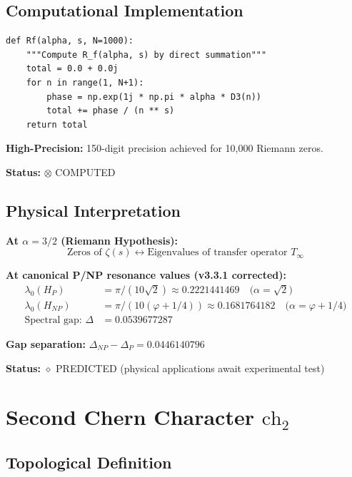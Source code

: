 \subsection{Computational Implementation}

\begin{verbatim}
def Rf(alpha, s, N=1000):
    """Compute R_f(alpha, s) by direct summation"""
    total = 0.0 + 0.0j
    for n in range(1, N+1):
        phase = np.exp(1j * np.pi * alpha * D3(n))
        total += phase / (n ** s)
    return total
\end{verbatim}

\textbf{High-Precision:} 150-digit precision achieved for 10,000 Riemann zeros.

\textbf{Status:} $\otimes$ COMPUTED

\subsection{Physical Interpretation}

\textbf{At $\alpha = 3/2$ (Riemann Hypothesis):}
\begin{equation}
\text{Zeros of } \zeta(s) \leftrightarrow \text{Eigenvalues of transfer operator } T_\infty
\end{equation}

\textbf{At canonical P/NP resonance values (v3.3.1 corrected):}
\begin{align}
\lambda_0(H_P) &= \pi/(10\sqrt{2}) \approx 0.2221441469 \quad \text{($\alpha = \sqrt{2}$)} \\
\lambda_0(H_{NP}) &= \pi/(10(\varphi+1/4)) \approx 0.1681764182 \quad \text{($\alpha = \varphi + 1/4$)} \\
\text{Spectral gap: } \Delta &= 0.0539677287
\end{align}

\textbf{Gap separation:} $\Delta_{NP} - \Delta_P = 0.0446140796$

\textbf{Status:} $\diamond$ PREDICTED (physical applications await experimental test)

\section{Second Chern Character $\text{ch}_2$}

\subsection{Topological Definition}

